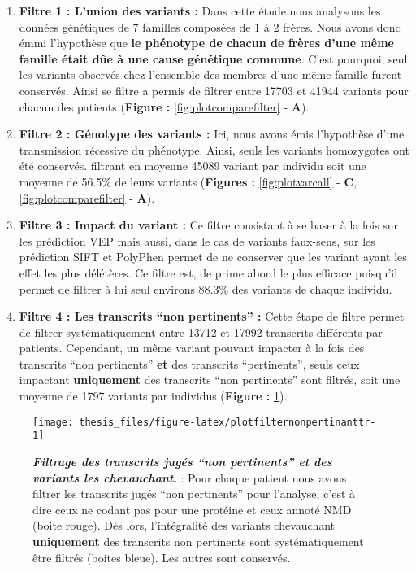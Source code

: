\documentclass[12pt,twoside]{ugathesis}
\begin{document}
\begin{enumerate}
\def\labelenumi{\arabic{enumi}.}
\item
  \textbf{Filtre 1 : L'union des variants :} Dans cette étude nous
  analysons les données génétiques de 7 familles composées de 1 à 2
  frères. Nous avons donc émmi l'hypothèse que \textbf{le phénotype de
  chacun de frères d'une même famille était dûe à une cause génétique
  commune}. C'est pourquoi, seul les variants observés chez l'ensemble
  des membres d'une même famille furent conservés. Ainsi se filtre a
  permis de filtrer entre 17703 et 41944 variants pour chacun des
  patients (\textbf{Figure : }\ref{fig:plotcomparefilter} - \textbf{A}).
\item
  \textbf{Filtre 2 : Génotype des variants :} Ici, nous avons émis
  l'hypothèse d'une transmission récessive du phénotype. Ainsi, seuls
  les variants homozygotes ont été conservés. filtrant en moyenne 45089
  variant par individu soit une moyenne de 56.5\% de leurs variants
  (\textbf{Figures : }\ref{fig:plotvarcall} - \textbf{C},
  \ref{fig:plotcomparefilter} - \textbf{A}).
\item
  \textbf{Filtre 3 : Impact du variant :} Ce filtre consistant à se
  baser à la fois sur les prédiction VEP mais aussi, dans le cas de
  variants faux-sens, sur les prédiction SIFT et PolyPhen permet de ne
  conserver que les variant ayant les effet les plus délétères. Ce
  filtre est, de prime abord le plus efficace puisqu'il permet de
  filtrer à lui seul environs 88.3\% des variants de chaque individu.
\item
  \textbf{Filtre 4 : Les transcrits ``non pertinents'' :} Cette étape de
  filtre permet de filtrer systématiquement entre 13712 et 17992
  transcrits différents par patients. Cependant, un même variant pouvant
  impacter à la fois des transcrits ``non pertinents'' \textbf{et} des
  transcrits ``pertinents'', seuls ceux impactant \textbf{uniquement}
  des transcrits ``non pertinents'' sont filtrés, soit une moyenne de
  1797 variants par individus (\textbf{Figure :
  }\ref{fig:plotfilternonpertinanttr}).
\end{enumerate}

\newpage 

\begin{figure}

{\centering \texttt{[image: thesis\_files/figure-latex/plotfilternonpertinanttr-1]} 

}

\caption[Filtrage des transcrits jugés "non pertinents" et des variants les chevauchant]{\textbf{\emph{Filtrage des transcrits
jugés ``non pertinents'' et des variants les chevauchant}.} : Pour
chaque patient nous avons filtrer les transcrits jugés ``non
pertinents'' pour l'analyse, c'est à dire ceux ne codant pas pour une
protéine et ceux annoté NMD (boite rouge). Dès lors, l'intégralité des
variants chevauchant \textbf{uniquement} des transcrits non pertinents
sont systématiquement être filtrés (boites bleue). Les autres sont
conservés.}\label{fig:plotfilternonpertinanttr}
\end{figure}
\end{document}

